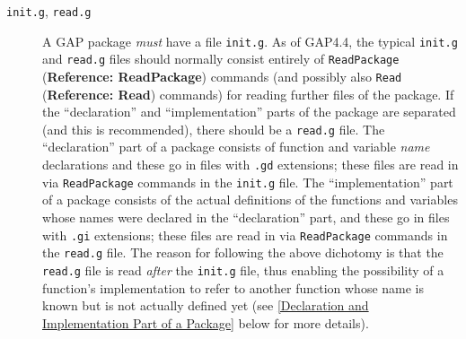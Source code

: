 \documentclass[a4paper,11pt]{report}
\begin{document}
{{\begin{description}
\item[{\texttt{init.g}, \texttt{read.g}}]    A \textsf{GAP} package \emph{must} have a file \texttt{init.g}. As of \textsf{GAP}{\nobreakspace}4.4, the typical \texttt{init.g} and \texttt{read.g} files should normally consist entirely of \texttt{ReadPackage} (\textbf{Reference: ReadPackage}) commands (and possibly also \texttt{Read} (\textbf{Reference: Read}) commands) for reading further files of the package. If the ``declaration'' and ``implementation'' parts of the package are separated (and this is recommended), there should be
a \texttt{read.g} file. The ``declaration'' part of a package consists of function and variable \emph{name} declarations and these go in files with \texttt{.gd} extensions; these files are read in via \texttt{ReadPackage} commands in the \texttt{init.g} file. The ``implementation'' part of a package consists of the actual definitions of the functions and
variables whose names were declared in the ``declaration'' part, and these go in files with \texttt{.gi} extensions; these files are read in via \texttt{ReadPackage} commands in the \texttt{read.g} file. The reason for following the above dichotomy is that the \texttt{read.g} file is read \emph{after} the \texttt{init.g} file, thus enabling the possibility of a function's implementation to refer to
another function whose name is known but is not actually defined yet (see \ref{Declaration and Implementation Part of a Package} below for more details). 


\end{description}}}
\end{document}
